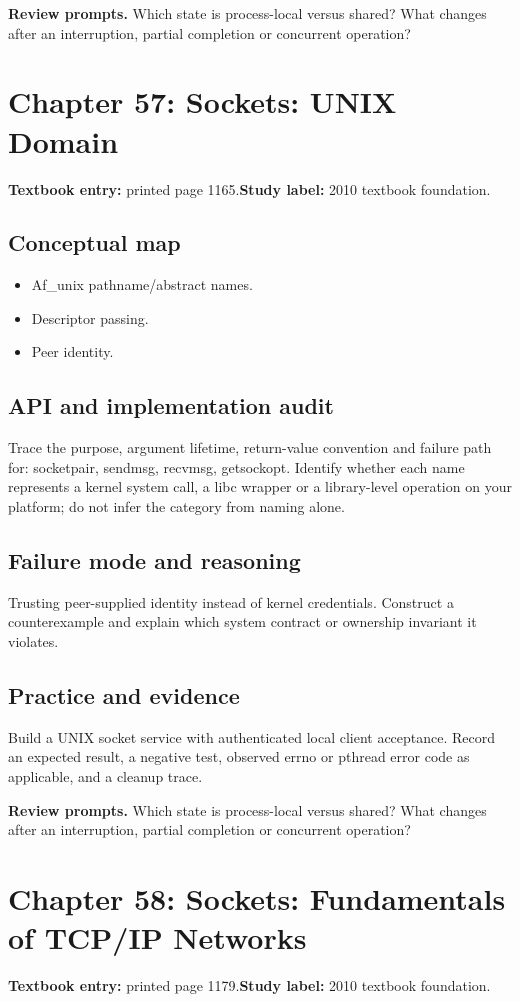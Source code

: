 \documentclass[11pt,letterpaper,oneside]{report}
\begin{document}
\textbf{Review prompts.} Which state is process-local versus shared? What changes after an interruption, partial completion or concurrent operation?

\section{Chapter 57: Sockets: UNIX Domain}
\textbf{Textbook entry:} printed page 1165.\quad \textbf{Study label:} 2010 textbook foundation.

\subsection{Conceptual map}
\begin{itemize}
\item Af\_unix pathname/abstract names.
\item Descriptor passing.
\item Peer identity.
\end{itemize}
\subsection{API and implementation audit}
Trace the purpose, argument lifetime, return-value convention and failure path for: socketpair, sendmsg, recvmsg, getsockopt. Identify whether each name represents a kernel system call, a libc wrapper or a library-level operation on your platform; do not infer the category from naming alone.

\subsection{Failure mode and reasoning}
Trusting peer-supplied identity instead of kernel credentials. Construct a counterexample and explain which system contract or ownership invariant it violates.

\subsection{Practice and evidence}
Build a UNIX socket service with authenticated local client acceptance. Record an expected result, a negative test, observed errno or pthread error code as applicable, and a cleanup trace.

\textbf{Review prompts.} Which state is process-local versus shared? What changes after an interruption, partial completion or concurrent operation?

\section{Chapter 58: Sockets: Fundamentals of TCP/IP Networks}
\textbf{Textbook entry:} printed page 1179.\quad \textbf{Study label:} 2010 textbook foundation.
\end{document}
